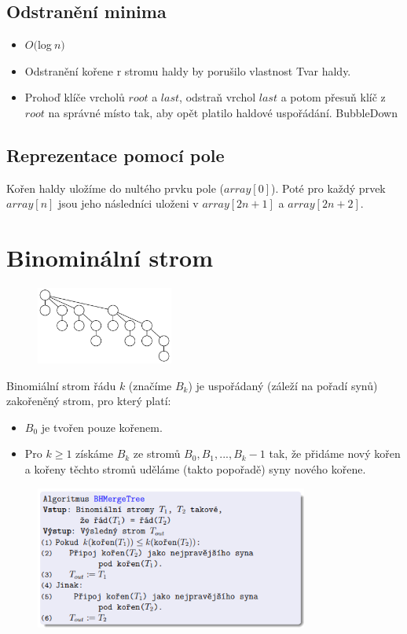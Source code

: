 \documentclass{szzclass}
\begin{document}
\subsection{Odstranění minima}
\begin{itemize}
    \item $O($log$~n)$
    \item Odstranění kořene r stromu haldy by porušilo vlastnost Tvar haldy.
    \item Prohoď klíče vrcholů $root$ a $last$, odstraň vrchol $last$ a potom přesuň klíč z $root$ na správné místo tak, aby opět platilo haldové uspořádání. BubbleDown
\end{itemize}

\subsection{Reprezentace pomocí pole}
Kořen haldy uložíme do nultého prvku pole ($array[0]$). Poté pro každý prvek $array[n]$ jsou jeho následníci uloženi v $array[2n+1]$ a $array[2n+2]$.


\section{Binominální strom}

\begin{figure}[h]
\centering
\includegraphics[width=0.4\textwidth]{topics/bi-spol-05/images/binominal-tree.png}
\end{figure}

Binomiální strom řádu $k$ (značíme $B_k$) je uspořádaný (záleží na
pořadí synů) zakořeněný strom, pro který platí:
\begin{itemize}
    \item $B_0$ je tvořen pouze kořenem.
    \item Pro $k \geq 1$ získáme $B_k$ ze stromů $B_0, B_1, . . . , B_k−1$ tak, že
    přidáme nový kořen a kořeny těchto stromů uděláme (takto
    popořadě) syny nového kořene.
\end{itemize}

\begin{figure}[h!]
\centering
\includegraphics[width=0.8\textwidth]{topics/bi-spol-05/images/BHMerge.png}
\end{figure}
\end{document}
